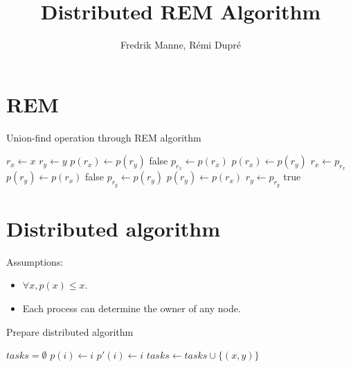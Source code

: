 \documentclass[12px]{article}
\title{Distributed REM Algorithm}
\author{Fredrik Manne, Rémi Dupré}
\begin{document}
  \maketitle

  \section{REM}
    \begin{algorithm}
      \caption{Union-find operation through REM algorithm}
      \begin{algorithmic}[1]
          \State $r_x \gets x$
          \State $r_y \gets y$
          \State
                \State $p(r_x) \gets p(r_y)$
                \State \Return false
              \Else
                \State $p_{r_x} \gets p(r_x)$
                \State $p(r_x) \gets p(r_y)$
                \State $r_x \gets p_{r_x}$
              \EndIf
            \Else
                \State $p(r_y) \gets p(r_x)$
                \State \Return false
              \Else
                \State $p_{r_y} \gets p(r_y)$
                \State $p(r_y) \gets p(r_x)$
                \State $r_y \gets p_{r_y}$
              \EndIf
            \EndIf
          \EndWhile
          \State
          \State \Return true
        \EndFunction
      \end{algorithmic}
    \end{algorithm}

  \section{Distributed algorithm}
    Assumptions:
    \begin{itemize}
      \item $\forall x, p(x) \leq x$.
      \item Each process can determine the owner of any node.
    \end{itemize}

    \begin{algorithm}
      \caption{Prepare distributed algorithm}
      \begin{algorithmic}[1]
        \State $tasks = \emptyset$
          \State $p(i) \gets i$   
          \State $p'(i) \gets i$  
        \EndFor
        \State
           
              \State {}
            \EndIf
            \State $tasks \gets tasks \cup \{(x, y)\}$
          \EndIf
        \EndFor
      \end{algorithmic}
    \end{algorithm}
\end{document}
